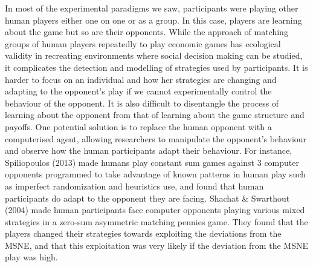 \documentclass[12pt]{article}         %
\begin{document}
In most of the experimental paradigms we saw, participants were playing other human players either one on one or as a group. In this case, players are learning about the game but so are their opponents. While the approach of matching groups of human players repeatedly to play economic games has ecological validity in recreating environments where social decision making can be studied, it complicates the detection and modelling of strategies used by participants. It is harder to focus on an individual and how her strategies are changing and adapting to the opponent's play if we cannot experimentally control the behaviour of the opponent. It is also difficult to disentangle the process of learning about the opponent from that of learning about the game structure and payoffs. One potential solution is to replace the human opponent with a computerised agent, allowing researchers to manipulate the opponent's behaviour and observe how the human participants adapt their behaviour. For instance, Spiliopoulos (2013) made humans play constant sum games against 3 computer opponents programmed to take advantage of known patterns in human play such as imperfect randomization and heuristics use, and found that human participants do adapt to the opponent they are facing. Shachat & Swarthout (2004) made human participants face computer opponents playing various mixed strategies in a zero-sum asymmetric matching pennies game. They found that the players changed their strategies towards exploiting the deviations from the MSNE, and that this exploitation was very likely if the deviation from the MSNE play was high.
\end{document}
